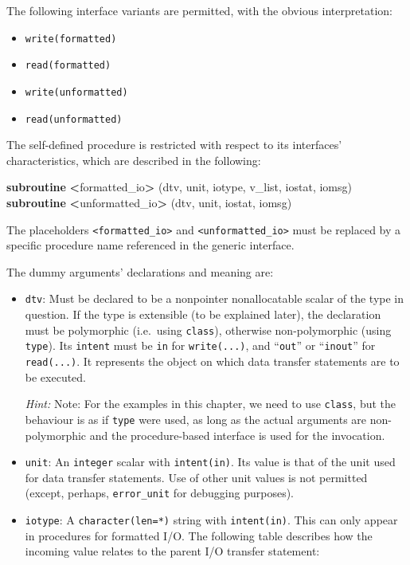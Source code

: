 \documentclass[
  paper=a4,
  ,captions=tableheading
]{scrartcl}
\newenvironment{Shaded}{\begin{snugshade}}{\end{snugshade}}
\newcommand{\KeywordTok}[1]{\textcolor[rgb]{0.13,0.29,0.53}{\textbf{#1}}}
\newcommand{\NormalTok}[1]{#1}
\newcommand{\OperatorTok}[1]{\textcolor[rgb]{0.81,0.36,0.00}{\textbf{#1}}}
\providecommand{\tightlist}{%
  \setlength{\itemsep}{0pt}\setlength{\parskip}{0pt}}
\begin{document}
The following interface variants are permitted, with the obvious
interpretation:

\begin{itemize}
\tightlist
\item
  \texttt{write(formatted)}
\item
  \texttt{read(formatted)}
\item
  \texttt{write(unformatted)}
\item
  \texttt{read(unformatted)}
\end{itemize}

The self-defined procedure is restricted with respect to its interfaces'
characteristics, which are described in the following:

\begin{Shaded}
\begin{Highlighting}[]
\KeywordTok{subroutine} \OperatorTok{\textless{}}\NormalTok{formatted\_io}\OperatorTok{\textgreater{}}\NormalTok{   (dtv, unit, iotype, v\_list, iostat, iomsg)}
\KeywordTok{subroutine} \OperatorTok{\textless{}}\NormalTok{unformatted\_io}\OperatorTok{\textgreater{}}\NormalTok{ (dtv, unit,                 iostat, iomsg)}
\end{Highlighting}
\end{Shaded}

The placeholders \texttt{\textless{}formatted\_io\textgreater{}} and
\texttt{\textless{}unformatted\_io\textgreater{}} must be replaced by a
specific procedure name referenced in the generic interface.

The dummy arguments' declarations and meaning are:

\begin{itemize}
\item
  \texttt{dtv}: Must be declared to be a nonpointer nonallocatable
  scalar of the type in question. If the type is extensible (to be
  explained later), the declaration must be polymorphic (i.e.~using
  \texttt{class}), otherwise non-polymorphic (using \texttt{type}). Its
  \texttt{intent} must be \texttt{in} for \texttt{write(...)}, and
  ``\texttt{out}'' or ``\texttt{inout}'' for \texttt{read(...)}. It
  represents the object on which data transfer statements are to be
  executed.

  \emph{Hint:} Note: For the examples in this chapter, we need to use
  \texttt{class}, but the behaviour is as if \texttt{type} were used, as
  long as the actual arguments are non-polymorphic and the
  procedure-based interface is used for the invocation.
\item
  \texttt{unit}: An \texttt{integer} scalar with \texttt{intent(in)}.
  Its value is that of the unit used for data transfer statements. Use
  of other unit values is not permitted (except, perhaps,
  \texttt{error\_unit} for debugging purposes).
\item
  \texttt{iotype}: A \texttt{character(len=*)} string with
  \texttt{intent(in)}. This can only appear in procedures for formatted
  I/O. The following table describes how the incoming value relates to
  the parent I/O transfer statement:
\end{itemize}
\end{document}
